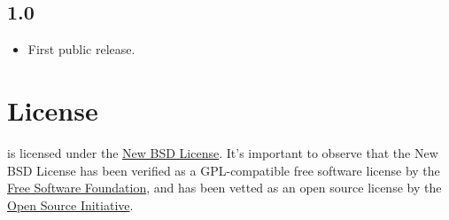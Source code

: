 \documentclass[a4paper,twoside,12pt]{memoir}
\begin{document}
\subsection*{1.0}

\begin{itemize}
\item[\featurenew] First public release.
\end{itemize}



\cleardoublepage

\section*{License}

\arara is licensed under the 
\href{http://www.opensource.org/licenses/bsd-license.php}{New BSD License}. 
It's important to observe that the New BSD License has been verified as a 
GPL-compatible free software license by the
\href{http://www.fsf.org/}{Free Software Foundation}, and has been vetted as an 
open source license by the 
\href{http://www.opensource.org/}{Open Source Initiative}.

\vfill
\end{document}
